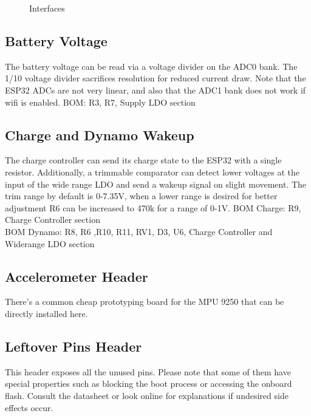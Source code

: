 \documentclass{article}
\begin{document}
\begin{figure}[H]
    \caption{Interfaces}
\end{figure}

\subsection{Battery Voltage}
The battery voltage can be read via a voltage divider on the ADC0 bank. The 1/10 voltage divider sacrifices resolution for reduced current draw. Note that the ESP32 ADCs are not very linear, and also that the ADC1 bank does not work if wifi is enabled.
\newline \newline
BOM: R3, R7, Supply LDO section
\subsection{Charge and Dynamo Wakeup}
The charge controller can send its charge state to the ESP32 with a single resistor. Additionally, a trimmable comparator can detect lower voltages at the input of the wide range LDO and send a wakeup signal on slight movement. The trim range by default is 0-7.35V, when a lower range is desired for better adjustment R6 can be increased to 470k for a range of 0-1V.
\newline \newline
BOM Charge: R9, Charge Controller section\\
BOM Dynamo: R8, R6 ,R10, R11, RV1, D3, U6, Charge Controller and Widerange LDO section
\subsection{Accelerometer Header}
There's a common cheap prototyping board for the MPU 9250 that can be directly installed here.
\subsection{Leftover Pins Header}
This header exposes all the unused pins. Please note that some of them have special properties such as blocking the boot process or accessing the onboard flash. Consult the datasheet or look online for explanations if undesired side effects occur.
\end{document}
